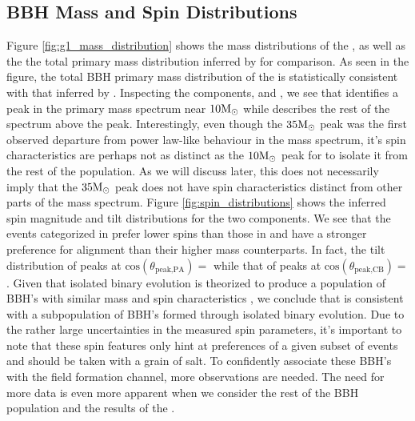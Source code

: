 \subsection{BBH Mass and Spin Distributions}


Figure \ref{fig:g1_mass_distribution} shows the mass distributions of the \base{}, as well as the the total primary mass distribution inferred by \brucepaper{} for comparison. As seen in the figure, the total BBH primary mass distribution of the \base{} is statistically consistent with that inferred by \brucepaper{}. Inspecting the components, \first{} and \contB{}, we see that \first{} identifies a peak in the primary mass spectrum near $10{\rm M}_\odot$ while \contB{} describes the rest of the spectrum above the peak. Interestingly, even though the $35{\rm M}_\odot$ peak was the first observed departure from power law-like behaviour in the mass spectrum, it's spin characteristics are perhaps not as distinct as the $10{\rm M}_\odot$ peak for \first{} to isolate it from the rest of the population. As we will discuss later, this does not necessarily imply that the $35{\rm M}_\odot$ peak does not have spin characteristics distinct from other parts of the mass spectrum. Figure \ref{fig:spin_distributions} shows the inferred spin magnitude and tilt distributions for the two components. We see that the events categorized in \first{} prefer lower spins than those in \contB{} and have a stronger preference for alignment than their higher mass counterparts. In fact, the tilt distribution of \first{} peaks at $\text{cos}(\theta_\text{peak,PA})=$ \result{$\CIPlusMinus{\macros[CosTilt][Base][Peak][max]}$} while that of \contB{} peaks at $\text{cos}(\theta_\text{peak,CB})=$ \result{$\CIPlusMinus{\macros[CosTilt][Base][Continuum][max]}$}. Given that isolated binary evolution is theorized to produce a population of BBH's with similar mass and spin characteristics , we conclude that \first{} is consistent with a subpopulation of BBH's formed through isolated binary evolution. Due to the rather large uncertainties in the measured spin parameters, it's important to note that these spin features only hint at preferences of a given subset of events and should be taken with a grain of salt. To confidently associate these BBH's with the field formation channel, more observations are needed. The need for more data is even more apparent when we consider the rest of the BBH population and the results of the \comp{}.

